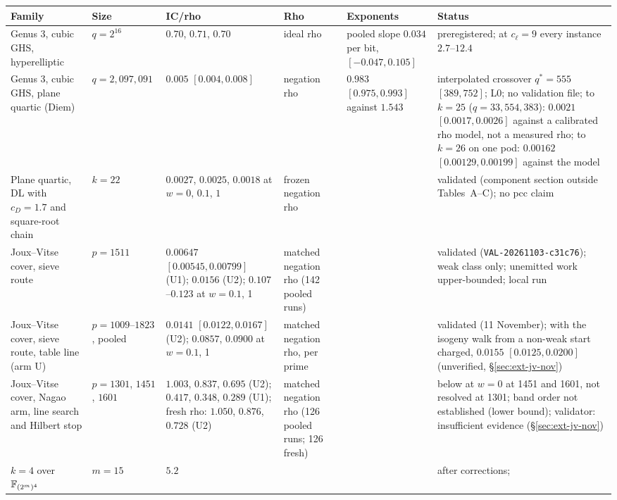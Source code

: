 \begin{table}[t]
\centering\small
\begin{tabularx}{\linewidth}{@{}>{\raggedright}p{2.4cm}>{\raggedright}p{1.5cm}>{\raggedright}p{2.6cm}>{\raggedright}p{1.7cm}>{\raggedright}p{1.8cm}>{\raggedright\arraybackslash}X@{}}
\toprule
Family & Size & IC/rho & Rho & Exponents & Status \\
\midrule
Genus 3, cubic GHS, hyperelliptic & $q=2^{16}$ & $0.70$, $0.71$, $0.70$ &
  ideal rho & pooled slope $0.034$ per bit, $[-0.047,\allowbreak 0.105]$ &
  preregistered; at $c_\ell=9$ every instance $2.7$--$12.4$ \\
Genus 3, cubic GHS, plane quartic (Diem) & $q=2{,}097{,}091$ & $0.005$
  $[0.004,0.008]$ & negation rho & $0.983$ $[0.975,0.993]$ against $1.543$
  & interpolated crossover $q^*=555$ $[389,752]$; L0; no validation file;
  to $k=25$ ($q=33{,}554{,}383$): $0.0021$ $[0.0017,0.0026]$ against a
  calibrated rho model, not a measured rho; to $k=26$ on one pod:
  $0.00162$ $[0.00129,0.00199]$ against the model \\
Plane quartic, DL with $c_D=1.7$ and square-root chain & $k=22$ &
  $0.0027$, $0.0025$, $0.0018$ at $w=0$, $0.1$, $1$ & frozen negation rho &
  & validated (component section outside Tables~A--C); no pcc claim \\
\addlinespace
Joux--Vitse cover, sieve route & $p=1511$ & $0.00647$ $[0.00545,0.00799]$
  (U1); $0.0156$ (U2); $0.107$--$0.123$ at $w=0.1$, 1 & matched negation rho
  (142 pooled runs) & & validated (\texttt{VAL-20261103-\allowbreak c31c76}); weak class
  only; unemitted work upper-bounded; local run \\
Joux--Vitse cover, sieve route, table line (arm U) & $p=1009$--$1823$,
  pooled & $0.0141$ $[0.0122,0.0167]$ (U2); $0.0857$, $0.0900$ at $w=0.1$,
  1 & matched negation rho, per prime & & validated (11 November); with
  the isogeny walk from a non-weak start charged, $0.0155$
  $[0.0125,0.0200]$ (unverified, \S\ref{sec:ext-jv-nov}) \\
Joux--Vitse cover, Nagao arm, line search and Hilbert stop & $p=1301$,
  $1451$, $1601$ & $1.003$, $0.837$, $0.695$ (U2); $0.417$, $0.348$, $0.289$
  (U1); fresh rho: $1.050$, $0.876$, $0.728$ (U2) & matched negation rho
  (126 pooled runs; 126 fresh) & & below at $w=0$ at 1451 and 1601, not
  resolved at 1301; band order not established (lower bound); validator:
  insufficient evidence (\S\ref{sec:ext-jv-nov}) \\
\addlinespace
$k=4$ over $\mathbb{F}_{(2^m)^4}$ & $m=15$ & $5.2$ & & & after corrections;

\end{tabularx}
\end{table}
